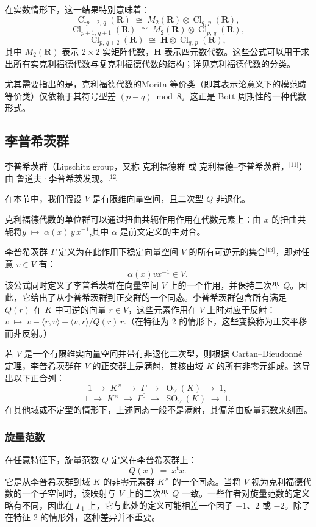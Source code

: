 在实数情形下，这一结果特别意味着：
$$
\operatorname{Cl}_{p+2,\,q}(\mathbf{R}) \;\cong\; M_2(\mathbf{R}) \otimes \operatorname{Cl}_{q,\,p}(\mathbf{R}),~
$$
$$
\operatorname{Cl}_{p+1,\,q+1}(\mathbf{R}) \;\cong\; M_2(\mathbf{R}) \otimes \operatorname{Cl}_{p,\,q}(\mathbf{R}),~
$$
$$
\operatorname{Cl}_{p,\,q+2}(\mathbf{R}) \;\cong\; \mathbf{H} \otimes \operatorname{Cl}_{q,\,p}(\mathbf{R}),~
$$
其中 $M_2(\mathbf{R})$ 表示 $2 \times 2$ 实矩阵代数，$\mathbf{H}$ 表示四元数代数。这些公式可以用于求出所有实克利福德代数与复克利福德代数的结构；详见克利福德代数的分类。

尤其需要指出的是，克利福德代数的Morita 等价类（即其表示论意义下的模范畴等价类）仅依赖于其符号型差 $(p - q) \bmod 8$。这正是 Bott 周期性的一种代数形式。
\subsection{李普希茨群}
李普希茨群（Lipschitz group，又称 克利福德群 或 克利福德–李普希茨群，\(^\text{[11]}\)）由 鲁道夫·李普希茨发现。\(^\text{[12]}\)

在本节中，我们假设 $V$ 是有限维向量空间，且二次型 $Q$ 非退化。

克利福德代数的单位群可以通过扭曲共轭作用作用在代数元素上：由 $x$ 的扭曲共轭将$y \;\mapsto\; \alpha(x)\, y\, x^{-1}$,其中 $\alpha$ 是前文定义的主对合。

李普希茨群 $\Gamma$ 定义为在此作用下稳定向量空间 $V$ 的所有可逆元的集合\(^\text{[13]}\)，即对任意 $v \in V$ 有：
$$
\alpha(x) v x^{-1} \in V.~
$$
该公式同时定义了李普希茨群在向量空间 $V$ 上的一个作用，并保持二次型 $Q$。因此，它给出了从李普希茨群到正交群的一个同态。李普希茨群包含所有满足 $Q(r)$ 在 $K$ 中可逆的向量 $r \in V$，这些元素作用在 $V$ 上时对应于反射：$v \;\mapsto\; v - \langle r, v \rangle + \langle v, r \rangle/Q(r)\, r$.（在特征为 2 的情形下，这些变换称为正交平移而非反射。）

若 $V$ 是一个有限维实向量空间并带有非退化二次型，则根据 Cartan–Dieudonné 定理，李普希茨群在 $V$ 的正交群上是满射，其核由域 $K$ 的所有非零元组成。这导出以下正合列：
$$
1 \;\longrightarrow\; K^{\times} \;\longrightarrow\; \Gamma \;\longrightarrow\; \operatorname{O}_V(K) \;\longrightarrow\; 1,~
$$
$$
1 \;\longrightarrow\; K^{\times} \;\longrightarrow\; \Gamma^{0} \;\longrightarrow\; \operatorname{SO}_V(K) \;\longrightarrow\; 1.~
$$
在其他域或不定型的情形下，上述同态一般不是满射，其偏差由旋量范数来刻画。
\subsubsection{旋量范数}
在任意特征下，旋量范数 $Q$ 定义在李普希茨群上：
$$
Q(x) \;=\; x^{\mathrm{t}}x .~
$$
它是从李普希茨群到域 $K$ 的非零元素群 $K^{\times}$ 的一个同态。当将 $V$ 视为克利福德代数的一个子空间时，该映射与 $V$ 上的二次型 $Q$ 一致。一些作者对旋量范数的定义略有不同，因此在 $\Gamma_{1}$ 上，它与此处的定义可能相差一个因子 $-1$、$2$ 或 $-2$。除了在特征 2 的情形外，这种差异并不重要。

